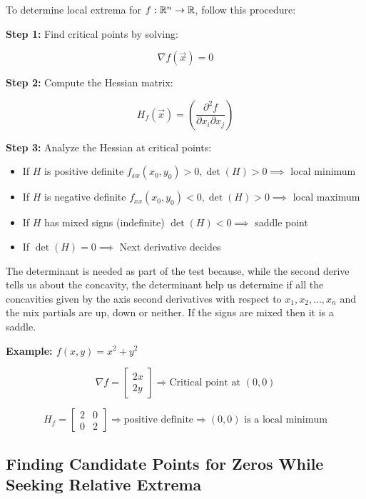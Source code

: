 To determine local extrema for \( f : \mathbb{R}^n \to \mathbb{R} \), follow this procedure:

\textbf{Step 1:} Find critical points by solving:

\[
    \nabla f(\vec{x}) = 0
\]

\textbf{Step 2:} Compute the Hessian matrix:

\[
    H_f(\vec{x}) = \left( \frac{\partial^2 f}{\partial x_i \partial x_j} \right)
\]

\textbf{Step 3:} Analyze the Hessian at critical points:

\begin{itemize}

    \item If \( H \) is positive definite \(f_{xx}(x_0, y_0) > 0, \det(H) > 0 \implies\) local minimum

    \item If \( H \) is negative definite \(f_{xx}(x_0, y_0) < 0, \det(H) > 0 \implies\) local maximum

    \item If \( H \) has mixed signs (indefinite) \(\det(H) < 0 \implies  \) saddle point

    \item If \(\det(H) = 0 \implies \) Next derivative decides

\end{itemize}

The determinant is needed as part of the test because, while the second derive tells us about the concavity, the 
determinant help us determine if all the concavities given by the axis second derivatives with respect to 
\(x_1, x_2, \dots, x_n\) and the mix partials are up, down or neither. If the signs are mixed then it is a saddle.  

\textbf{Example: \( f(x, y) = x^2 + y^2 \)}

\[
    \nabla f = \begin{bmatrix} 2x \\ 2y \end{bmatrix} \Rightarrow \text{Critical point at } (0, 0)
\]

\[
    H_f = \begin{bmatrix} 2 & 0 \\ 0 & 2 \end{bmatrix} \Rightarrow \text{positive definite}
    \Rightarrow (0, 0) \text{ is a local minimum}
\]

\subsection{Finding Candidate Points for Zeros While Seeking Relative Extrema}

